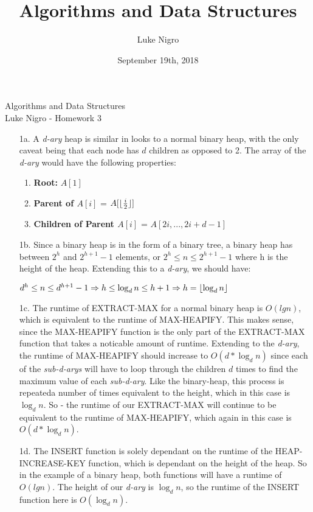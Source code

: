 \documentclass{article}
\author{Luke Nigro}
\title{Algorithms and Data Structures}
\date{September 19th, 2018}
\DeclarePairedDelimiter\floor{\lfloor}{\rfloor}
\begin{document}
\centering \Huge Algorithms and Data Structures \\
\Large Luke Nigro - Homework 3 \\
\begin{flushleft}
\begin{enumerate}
\setlength\itemsep{2em}

\item[1a.] A {\itshape d-ary} heap is similar in looks to a normal binary heap, with the only caveat being that each node has $d$ children as opposed to 2. The array of the {\itshape d-ary} would have the following properties:\\
\begin{enumerate}
\item \textbf{Root:} $A[1]$\\
\item \textbf{Parent of $A[i]$}  = $A[\floor{\frac{i}{2}}]$\\
\item \textbf{Children of Parent $A[i]$} = $A[2i, ...,2i + d - 1]$
\end{enumerate}

\item[1b.] Since a binary heap is in the form of a binary tree, a binary heap has between $2^h$ and $2^{h + 1}-1$ elements, or $2^h \leq n \leq 2^{h + 1}-1$ where h is the height of the heap. Extending this to a {\itshape d-ary}, we should have: \par
\bigskip
$d^h \leq n \leq d^{h + 1}-1\Rightarrow h \leq \log_dn \leq h + 1 \Rightarrow h = \floor{\log_dn}$

\item[1c.]The runtime of EXTRACT-MAX for a normal binary heap is $O(lgn)$, which is equivalent to the runtime of MAX-HEAPIFY. This makes sense, since the MAX-HEAPIFY function is the only part of the EXTRACT-MAX function that takes a noticable amount of runtime. Extending to the {\itshape d-ary}, the runtime of MAX-HEAPIFY should increase to $O(d*\log_dn)$ since each of the {\itshape sub-d-arys} will have to loop through the children $d$ times to find the maximum value of each {\itshape sub-d-ary}. Like the binary-heap, this process is repeateda number of times equivalent to the height, which in this case is $\log_dn$.  So - the runtime of our EXTRACT-MAX will continue to be equivalent to the runtime of MAX-HEAPIFY, which again in this case is  $O(d*\log_dn)$.

\item[1d.] The INSERT function is solely dependant on the runtime of the HEAP-INCREASE-KEY function, which is dependant on the height of the heap. So in the example of a binary heap, both functions will have a runtime of $O(lgn)$. The height of our {\itshape d-ary} is $\log_dn$, so the runtime of the INSERT function here is $O(\log_dn)$.


\end{enumerate}
\end{flushleft}
\end{document}
